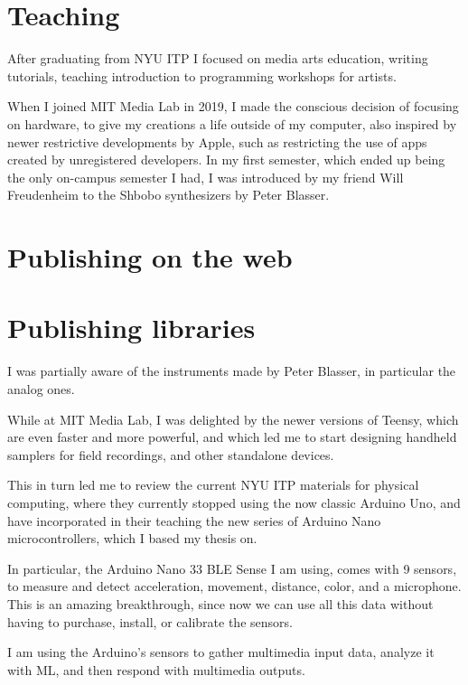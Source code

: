 \section{Teaching}

After graduating from \acrshort{NYU} \acrshort{ITP} I focused on media arts education, writing tutorials, teaching introduction to programming workshops for artists.

When I joined MIT Media Lab in 2019, I made the conscious decision of focusing on hardware, to give my creations a life outside of my computer, also inspired by newer restrictive developments by Apple, such as restricting the use of apps created by unregistered developers. In my first semester, which ended up being the only on-campus semester I had, I was introduced by my friend Will Freudenheim to the Shbobo synthesizers by Peter Blasser.

\section{Publishing on the web}

\section{Publishing libraries}

I was partially aware of the instruments made by Peter Blasser, in particular the analog ones.

While at MIT Media Lab, I was delighted by the newer versions of Teensy, which are even faster and more powerful, and which led me to start designing handheld samplers for field recordings, and other standalone devices.

This in turn led me to review the current \acrshort{NYU} \acrshort{ITP} materials for physical computing, where they currently stopped using the now classic Arduino Uno, and have incorporated in their teaching the new series of Arduino Nano microcontrollers, which I based my thesis on.

In particular, the Arduino Nano 33 \acrshort{BLE} Sense I am using, comes with 9 sensors, to measure and detect acceleration, movement, distance, color, and a microphone. This is an amazing breakthrough, since now we can use all this data without having to purchase, install, or calibrate the sensors.

I am using the Arduino's sensors to gather multimedia input data, analyze it with \acrshort{ML}, and then respond with multimedia outputs.

